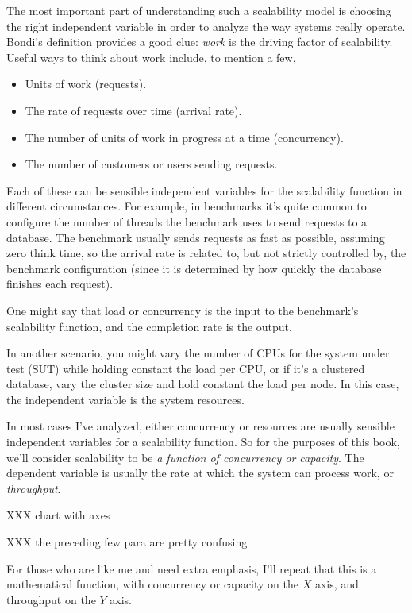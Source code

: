 \documentclass{vivid_layout}
\begin{document}
The most important part of understanding such a scalability model is choosing
the right independent variable in order to analyze the way systems really
operate.  Bondi's definition provides a good clue: {\itshape work} is the
driving factor of scalability. Useful ways to think about work include, to
mention a few,

\begin{itemize}
\item Units of work (requests).
\item The rate of requests over time (arrival rate).
\item The number of units of work in progress at a time (concurrency).
\item The number of customers or users sending requests.
\end{itemize}

Each of these can be sensible independent variables for the scalability function
in different circumstances. For example, in benchmarks it's quite common to
configure the number of threads the benchmark uses to send requests to a
database. The benchmark usually sends requests as fast as possible, assuming
zero think time, so the arrival rate is related to, but not strictly controlled
by, the benchmark configuration (since it is determined by how quickly the database finishes each request).

One might say that load or concurrency is the input to the benchmark's
scalability function, and the completion rate is the output.

In another scenario, you might vary the number of CPUs for the system under test
(SUT) while holding constant the load per CPU, or if it's a clustered database,
vary the cluster size and hold constant the load per node. In this case, the
independent variable is the system resources.

In most cases I've analyzed, either concurrency or resources are usually
sensible independent variables for a scalability function. So for
the purposes of this book, we'll consider scalability to be {\itshape a function
of concurrency or capacity}. The dependent variable is usually the rate at which
the system can process work, or {\itshape throughput}.

XXX chart with axes

XXX the preceding few para are pretty confusing

For those who are like me and need extra emphasis, I'll repeat that this is a
mathematical function, with concurrency or capacity on the $X$ axis, and
throughput on the $Y$ axis.
\end{document}

